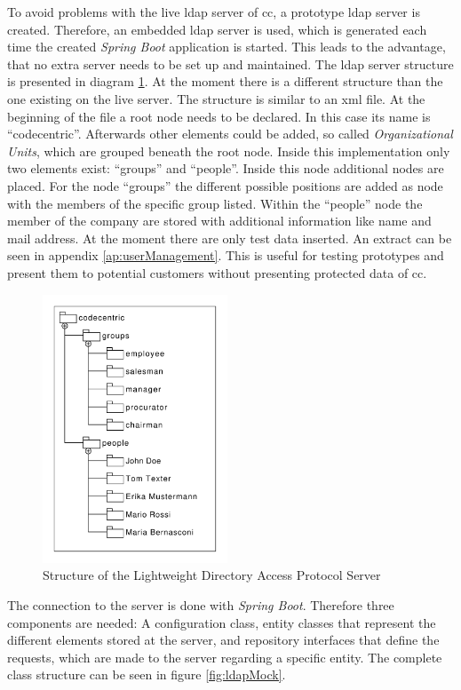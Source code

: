 To avoid problems with the live \gls{ldap} server of \gls{cc}, a prototype \gls{ldap} server is created. Therefore, an embedded \gls{ldap} server is used, which is generated each time the created \textit{Spring Boot} application is started. This leads to the advantage, that no extra server needs to be set up and maintained. \newline
The \gls{ldap} server structure is presented in diagram \ref{fig:ldap}. At the moment there is a different structure than the one existing on the live server. The structure is similar to an \gls{xml} file. 
At the beginning of the file a root node needs to be declared. In this case its name is ``codecentric''. Afterwards other elements could be added, so called \textit{Organizational Units}, which are grouped beneath the root node. Inside this implementation only two elements exist: ``groups'' and ``people''. Inside this node additional nodes are placed. For the node ``groups'' the different possible positions are added as node with the members of the specific group listed. Within the ``people'' node the member of the company are stored with additional information like name and mail address. At the moment there are only test data inserted. An extract can be seen in appendix \ref{ap:userManagement}. This is useful for testing prototypes and present them to potential customers without presenting protected data of \gls{cc}.

\begin{figure}[h!]
	\includegraphics[height=8cm]{./implementation/images/ldap.pdf}
	\centering
	\caption{Structure of the Lightweight Directory Access Protocol Server}
	\label{fig:ldap}
\end{figure}

The connection to the server is done with \textit{Spring Boot}. Therefore three components are needed: A configuration class, entity classes that represent the different elements stored at the server, and repository interfaces that define the requests, which are made to the server regarding a specific entity. The complete class structure can be seen in figure \ref{fig:ldapMock}.

